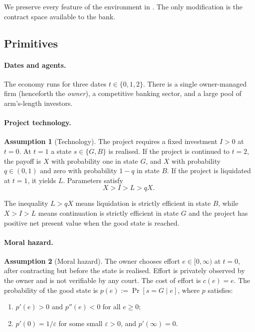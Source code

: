 \documentclass[12pt,a4paper]{article}
\theoremstyle{plain}
\theoremstyle{definition}
\newtheorem{assumption}{Assumption}
\theoremstyle{remark}
\begin{document}
We preserve every feature of the environment in \citet{Rajan1992}. The only
modification is the contract space available to the bank.

\subsection{Primitives}

\paragraph{Dates and agents.}
The economy runs for three dates $t \in \{0,1,2\}$. There is a single
owner-managed firm (henceforth the \emph{owner}), a competitive banking sector, and
a large pool of arm's-length investors.

\paragraph{Project technology.}
\begin{assumption}[Technology]
\label{a:technology}
The project requires a fixed investment $I > 0$ at $t=0$. At $t=1$ a state
$s \in \{G,B\}$ is realised. If the project is continued to $t=2$, the payoff is $X$
with probability one in state $G$, and $X$ with probability $q \in (0,1)$ and zero
with probability $1-q$ in state $B$. If the project is liquidated at $t=1$, it yields
$L$. Parameters satisfy
\begin{equation}
  X > I > L > qX.
  \label{eq:param_order}
\end{equation}
\end{assumption}

The inequality $L > qX$ means liquidation is strictly efficient in state $B$, while
$X > I > L$ means continuation is strictly efficient in state $G$ and the project has
positive net present value when the good state is reached.

\paragraph{Moral hazard.}
\begin{assumption}[Moral hazard]
\label{a:moral_hazard}
The owner chooses effort $e \in [0,\infty)$ at $t=0$, after contracting but before the
state is realised. Effort is privately observed by the owner and is not verifiable by
any court. The cost of effort is $c(e) = e$. The probability of the good state is
$p(e) := \Pr[s = G \mid e]$, where $p$ satisfies:
\begin{enumerate}[nosep,label=(\roman*)]
  \item $p'(e) > 0$ and $p''(e) < 0$ for all $e \geq 0$;
  \item $p'(0) = 1/\varepsilon$ for some small $\varepsilon > 0$, and $p'(\infty) = 0$.
\end{enumerate}
\end{assumption}
\end{document}
